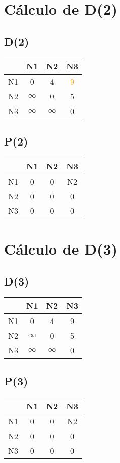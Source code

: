 \documentclass[a4paper,11pt]{article}
\begin{document}
\section*{Cálculo de D(2)}
\subsection*{D(2)}
\begin{center}
\begin{tabular}{c|ccc}
 & N1 & N2 & N3 \\ \hline
N1 & 0 & 4 & \textcolor{orange}{9} \\
N2 & $\infty$ & 0 & 5 \\
N3 & $\infty$ & $\infty$ & 0 \\
\end{tabular}
\end{center}
\subsection*{P(2)}
\begin{center}
\begin{tabular}{c|ccc}
 & N1 & N2 & N3 \\ \hline
N1 & 0 & 0 & N2 \\
N2 & 0 & 0 & 0 \\
N3 & 0 & 0 & 0 \\
\end{tabular}
\end{center}
\newpage
\section*{Cálculo de D(3)}
\subsection*{D(3)}
\begin{center}
\begin{tabular}{c|ccc}
 & N1 & N2 & N3 \\ \hline
N1 & 0 & 4 & 9 \\
N2 & $\infty$ & 0 & 5 \\
N3 & $\infty$ & $\infty$ & 0 \\
\end{tabular}
\end{center}
\subsection*{P(3)}
\begin{center}
\begin{tabular}{c|ccc}
 & N1 & N2 & N3 \\ \hline
N1 & 0 & 0 & N2 \\
N2 & 0 & 0 & 0 \\
N3 & 0 & 0 & 0 \\
\end{tabular}
\end{center}
\newpage
\end{document}
